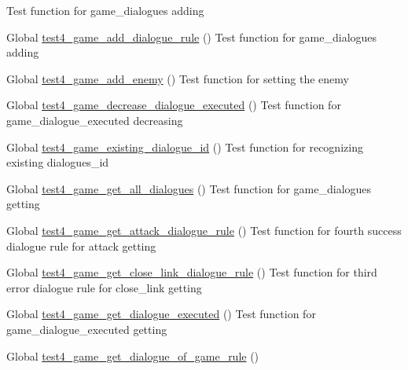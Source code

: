 \begin{DoxyRefList}
%
Test function for game\+\_\+dialogues adding  
\item[Global \mbox{\hyperlink{game__test_8c_a78a2a1fc40ee1dcfb2db66596f64c6b7}{test4\+\_\+game\+\_\+add\+\_\+dialogue\+\_\+rule}} ()]\label{test__test000297}%
%
Test function for game\+\_\+dialogues adding  
\item[Global \mbox{\hyperlink{game__test_8c_aa531b0484f28caf27080ee0bcc1dfc05}{test4\+\_\+game\+\_\+add\+\_\+enemy}} ()]\label{test__test000179}%
%
Test function for setting the enemy  
\item[Global \mbox{\hyperlink{game__test_8c_a92c3aab0ace36221c997fbd5ed8a7aed}{test4\+\_\+game\+\_\+decrease\+\_\+dialogue\+\_\+executed}} ()]\label{test__test000310}%
%
Test function for game\+\_\+dialogue\+\_\+executed decreasing  
\item[Global \mbox{\hyperlink{game__test_8c_ac10fd2969000c7279b6a8518693c5a2f}{test4\+\_\+game\+\_\+existing\+\_\+dialogue\+\_\+id}} ()]\label{test__test000289}%
%
Test function for recognizing existing dialogues\+\_\+id  
\item[Global \mbox{\hyperlink{game__test_8c_a16e738fc11c1b3a975a3f670bcde2ebe}{test4\+\_\+game\+\_\+get\+\_\+all\+\_\+dialogues}} ()]\label{test__test000395}%
%
Test function for game\+\_\+dialogues getting  
\item[Global \mbox{\hyperlink{game__test_8c_a619324f2f6165aa0075b3df4c914bb6e}{test4\+\_\+game\+\_\+get\+\_\+attack\+\_\+dialogue\+\_\+rule}} ()]\label{test__test000334}%
%
Test function for fourth success dialogue rule for attack getting  
\item[Global \mbox{\hyperlink{game__test_8c_a43e77fb1eb251ffd49c43dbf4e4a8622}{test4\+\_\+game\+\_\+get\+\_\+close\+\_\+link\+\_\+dialogue\+\_\+rule}} ()]\label{test__test000380}%
%
Test function for third error dialogue rule for close\+\_\+link getting  
\item[Global \mbox{\hyperlink{game__test_8c_abd861398a53bc23e943de52d55d4acfb}{test4\+\_\+game\+\_\+get\+\_\+dialogue\+\_\+executed}} ()]\label{test__test000302}%
%
Test function for game\+\_\+dialogue\+\_\+executed getting  
\item[Global \mbox{\hyperlink{game__test_8c_aec3b43f47c15f8d2a525f1ca94e46d7d}{test4\+\_\+game\+\_\+get\+\_\+dialogue\+\_\+of\+\_\+game\+\_\+rule}} ()]\label{test__test000390}%

\end{DoxyRefList}
